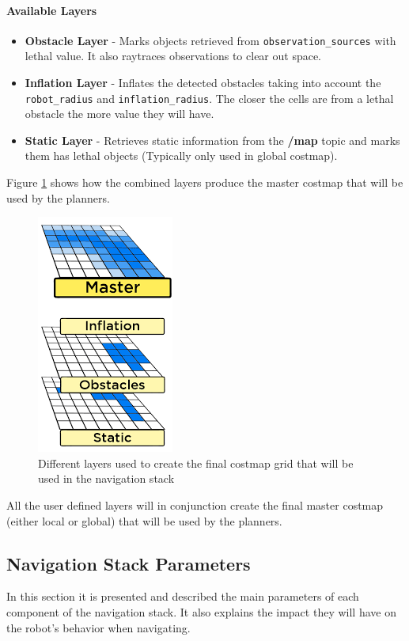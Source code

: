 \documentclass[12pt]{article}
\begin{document}
\paragraph{Available Layers}
\begin{itemize}[label={}]
    \item \textbf{Obstacle Layer} - Marks objects retrieved from \texttt{observation\_sources} with lethal value. It also raytraces observations to clear out space.
    \item \textbf{Inflation Layer} - Inflates the detected obstacles taking into account the \texttt{robot\_radius} and \texttt{inflation\_radius}. The closer the cells are from a lethal obstacle the more value they will have.
    \item \textbf{Static Layer} - Retrieves static information from the \textbf{/map} topic and marks them has lethal objects (Typically only used in global costmap).
\end{itemize}
Figure \ref{fig:layers} shows how the combined layers produce the master costmap that will be used by the planners.
\begin{figure}[!htb]
    \centering
    \includegraphics{layers.png}
    \caption{Different layers used to create the final costmap grid that will be used in the navigation stack}
    \label{fig:layers}
\end{figure}
All the user defined layers will in conjunction create the final master costmap (either local or global) that will be used by the planners.


\subsection{Navigation Stack Parameters}
In this section it is presented and described the main parameters of each component of the navigation stack. It also explains the impact they will have on the robot's behavior when navigating.
\end{document}
